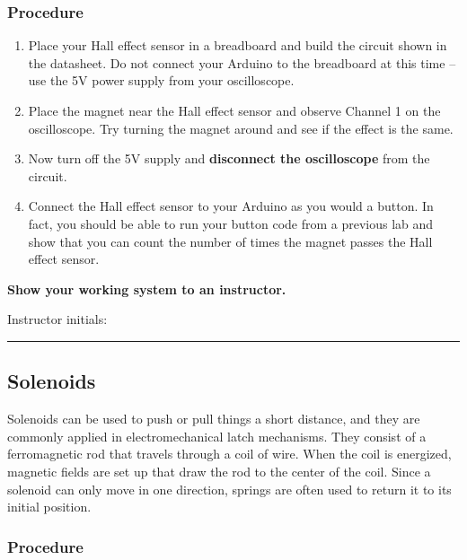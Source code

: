 \documentclass[11pt]{article} %
\begin{document}
\subsubsection*{Procedure}

\begin{enumerate}
\item Place your Hall effect sensor in a breadboard and build the circuit shown in the datasheet. Do not connect your Arduino to the breadboard at this time -- use the 5V power supply from your oscilloscope.
\item Place the magnet near the Hall effect sensor and observe Channel 1 on the oscilloscope. Try turning the magnet around and see if the effect is the same.
\item Now turn off the 5V supply and {\bf disconnect the oscilloscope} from the circuit.
\item Connect the Hall effect sensor to your Arduino as you would a button. In fact, you should be able to run your button code from a previous lab and show that you can count the number of times the magnet passes the Hall effect sensor.
\end{enumerate}

{\bf Show your working system to an instructor.}

\vspace{0.25in}
Instructor initials: \rule{2in}{0.4pt}
\vspace{0.25in}

\subsection*{Solenoids}
\label{sec:solenoids}

Solenoids can be used to push or pull things a short distance, and they are commonly applied in electromechanical latch mechanisms. They consist of a ferromagnetic rod that travels through a coil of wire. When the coil is energized, magnetic fields are set up that draw the rod to the center of the coil. Since a solenoid can only move in one direction, springs are often used to return it to its initial position.

\subsubsection*{Procedure}
\end{document}

